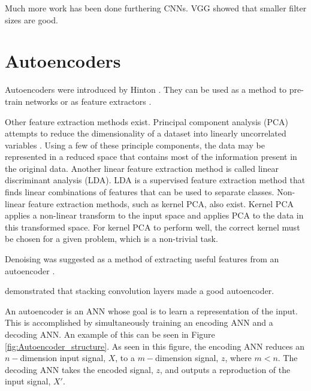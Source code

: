 Much more work has been done furthering CNNs. VGG \cite{Simonyan2014} showed that smaller filter sizes are good. 

\section{Autoencoders} \label{Autoencoders}

Autoencoders were introduced by Hinton \cite{Hinton2006}. They can be used as a method to pre-train networks or as feature extractors \cite{CHARTE2018}.

Other feature extraction methods exist. Principal component analysis (PCA) attempts to reduce the dimensionality of a dataset into linearly uncorrelated variables \cite{Jolliffe2002}. Using a few of these principle components, the data may be represented in a reduced space that contains most of the information present in the original data. Another linear feature extraction method is called linear discriminant analysis (LDA). LDA is a supervised feature extraction method that finds linear combinations of features that can be used to separate classes. Non-linear feature extraction methods, such as kernel PCA, also exist. Kernel PCA applies a non-linear transform to the input space and applies PCA to the data in this transformed space. For kernel PCA to perform well, the correct kernel must be chosen for a given problem, which is a non-trivial task.

Denoising was suggested as a method of extracting useful features from an autoencoder \cite{Vincent2008, Vincent2010}.

\cite{Masci2011} demonstrated that stacking convolution layers made a good autoencoder.


An autoencoder is an ANN whose goal is to learn a representation of the input. This is accomplished by simultaneously training an encoding ANN and a decoding ANN. An example of this can be seen in Figure \ref{fig:Autoencoder_structure}. As seen in this figure, the encoding ANN reduces an $n-$dimension input signal, $X$, to a $m-$dimension signal, $z$, where $m < n$. The decoding ANN takes the encoded signal, $z$, and outputs a reproduction of the input signal, $X'$.


